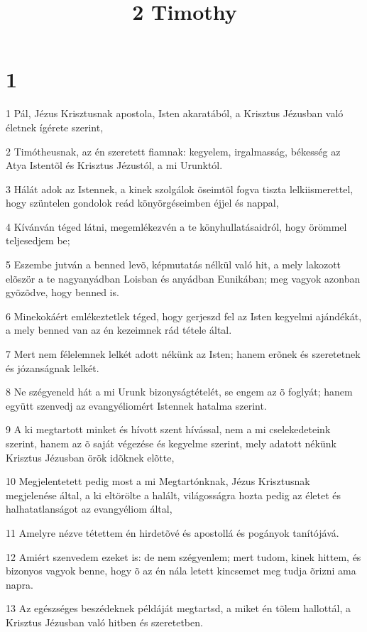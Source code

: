 

\title{2 Timothy}


\chapter{1}

\par 1 Pál, Jézus Krisztusnak apostola, Isten akaratából, a Krisztus Jézusban való életnek ígérete szerint,
\par 2 Timótheusnak, az én szeretett fiamnak: kegyelem, irgalmasság, békesség az Atya Istentõl és Krisztus Jézustól, a mi Urunktól.
\par 3 Hálát adok az Istennek, a kinek szolgálok õseimtõl fogva tiszta lelkiismerettel, hogy szüntelen gondolok reád könyörgéseimben éjjel és nappal,
\par 4 Kívánván téged látni, megemlékezvén a te könyhullatásaidról, hogy örömmel teljesedjem be;
\par 5 Eszembe jutván a benned levõ, képmutatás nélkül való hit, a mely lakozott elõször a te nagyanyádban Loisban és anyádban Eunikában; meg vagyok azonban gyõzõdve, hogy benned is.
\par 6 Minekokáért emlékeztetlek téged, hogy gerjeszd fel az Isten kegyelmi ajándékát, a mely benned van az én kezeimnek rád tétele által.
\par 7 Mert nem félelemnek lelkét adott nékünk az Isten; hanem erõnek és szeretetnek és józanságnak lelkét.
\par 8 Ne szégyeneld hát a mi Urunk bizonyságtételét, se engem az õ foglyát; hanem együtt szenvedj az evangyéliomért Istennek hatalma szerint.
\par 9 A ki megtartott minket és hívott szent hívással, nem a mi cselekedeteink szerint, hanem az õ saját végezése és kegyelme szerint, mely adatott nékünk Krisztus Jézusban örök idõknek elõtte,
\par 10 Megjelentetett pedig most a mi Megtartónknak, Jézus Krisztusnak megjelenése által, a ki eltörölte a halált,  világosságra hozta pedig az életet és halhatatlanságot az evangyéliom által,
\par 11 Amelyre nézve tétettem én hirdetõvé és apostollá és pogányok tanítójává.
\par 12 Amiért szenvedem ezeket is: de nem szégyenlem; mert tudom, kinek hittem, és bizonyos vagyok benne, hogy õ az én nála letett kincsemet meg tudja õrizni ama napra.
\par 13 Az egészséges beszédeknek példáját megtartsd, a miket én tõlem hallottál, a Krisztus Jézusban való hitben és szeretetben.
